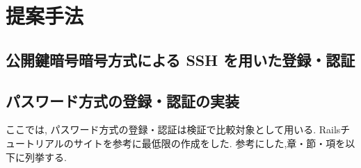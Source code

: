 \chapter{提案手法}
\label{chap:propose}

\section{公開鍵暗号暗号方式による SSH を用いた登録・認証}

\section{パスワード方式の登録・認証の実装}
ここでは,
パスワード方式の登録・認証は検証で比較対象として用いる.
Railsチュートリアルのサイト\cite{Rails tutorial}を参考に最低限の作成をした.
参考にした,章・節・項を以下に列挙する.

